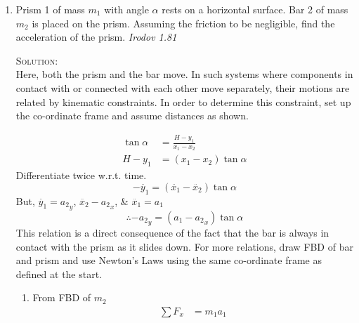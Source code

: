 \begin{enumerate}
\item Prism 1 of mass $m_1$ with angle $\alpha$ rests on a horizontal surface. Bar 2 of mass $m_2$ is placed on the prism. Assuming the friction to be negligible, find the acceleration of the prism. \hfill \textsl{Irodov 1.81}
\begin{figure}[hbt]
    \centering
    
\end{figure}

\textsc{Solution:}\\
Here, both the prism and the bar move. In such systems where components in contact with or connected with each other move separately, their motions are related by kinematic constraints. In order to determine this constraint, set up the co-ordinate frame and assume distances as shown.
\begin{figure}[hbt]
    \centering
    
\end{figure}
\begin{align*}
\tan\alpha&=\frac{H-y_1}{x_1-x_2}\\
H-y_1&=(x_1-x_2)\tan\alpha
\end{align*}
Differentiate twice w.r.t. time.
\[
-\ddot{y_1}=(\ddot{x_1}-\ddot{x_2})\tan\alpha
\]
But, $\ddot{y_1}={a_2}_y$, $\ddot{x_2}-{a_2}_x$, \& $\ddot{x_1}=a_1$
\begin{equation}
\therefore -{a_2}_y=(a_1-{a_2}_x)\tan\alpha \label{eq37}
\end{equation}
This relation is a direct consequence of the fact that the bar is always in contact with the prism as it slides down. For more relations, draw FBD of bar and prism and use Newton's Laws using the same co-ordinate frame as defined at the start.
\begin{figure}[!htb]
    \centering
    \begin{minipage}{.45 \textwidth}
        \centering
        
    \end{minipage}
    \begin{minipage}{.45 \textwidth}
        \centering
        
    \end{minipage}
\end{figure}
\begin{enumerate}
\item From FBD of $m_2$
\begin{align}
\sum F_x&=m_1a_1 \nonumber\\

\end{align}
\end{enumerate}
\end{enumerate}
